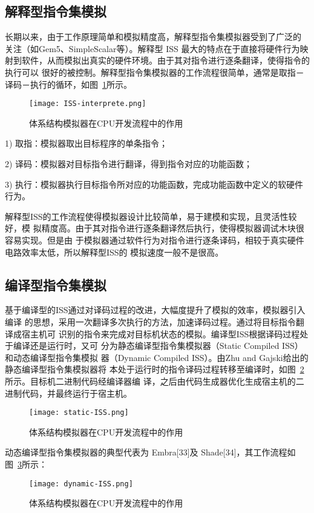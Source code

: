 \subsection{解释型指令集模拟}
长期以来，由于工作原理简单和模拟精度高，解释型指令集模拟器受到了广泛的
关注（如Gem5、SimpleScalar等）。解释型 ISS 最大的特点在于直接将硬件行为映
射到软件\cite{jump}，从而模拟出真实的硬件环境。由于其对指令进行逐条翻译，使得指令的执行可以
很好的被控制。解释型指令集模拟器的工作流程很简单，通常是取指－译码－执行的循环，如图~\ref{fig:ISS-interprete}所示。
\begin{figure}[h]
  \centering
  \texttt{[image: ISS-interprete.png]}
  \caption{体系结构模拟器在CPU开发流程中的作用}
  \label{fig:ISS-interprete}
\end{figure}


1) 取指：模拟器取出目标程序的单条指令；


2) 译码：模拟器对目标指令进行翻译，得到指令对应的功能函数； 


3) 执行：模拟器执行目标指令所对应的功能函数，完成功能函数中定义的软硬件行为。


解释型ISS的工作流程使得模拟器设计比较简单，易于建模和实现，且灵活性较好，模
拟精度高。由于其对指令进行逐条翻译然后执行，使得模拟器调试木块很容易实现。但是由
于模拟器通过软件行为对指令进行逐条译码，相较于真实硬件电路效率太低，所以解释型ISS的
模拟速度一般不是很高。


\subsection{编译型指令集模拟}
基于编译型的ISS通过对译码过程的改进，大幅度提升了模拟的效率，模拟器引入编译
的思想，采用一次翻译多次执行的方法，加速译码过程。通过将目标指令翻译成宿主机可
识别的指令来完成对目标机状态的模拟。编译型ISS根据译码过程处于编译还是运行时，又可
分为静态编译型指令集模拟器（Static Compiled ISS）和动态编译型指令集模拟
器（Dynamic Compiled ISS）。由Zhu and Gajski给出的静态编译型指令集模拟器将
本处于运行时的指令译码过程转移至编译时，如图~\ref{fig:static-ISS}所示。目标机二进制代码经编译器编
译，之后由代码生成器优化生成宿主机的二进制代码，并最终运行于宿主机。
\begin{figure}[h]
  \centering
  \texttt{[image: static-ISS.png]}
  \caption{体系结构模拟器在CPU开发流程中的作用}
  \label{fig:static-ISS}
\end{figure}


动态编译型指令集模拟器的典型代表为 Embra[33]及 Shade[34]，其工作流程如图~\ref{fig:dynamic-ISS}所示：
\begin{figure}[h]
  \centering
  \texttt{[image: dynamic-ISS.png]}
  \caption{体系结构模拟器在CPU开发流程中的作用}
  \label{fig:dynamic-ISS}
\end{figure}


